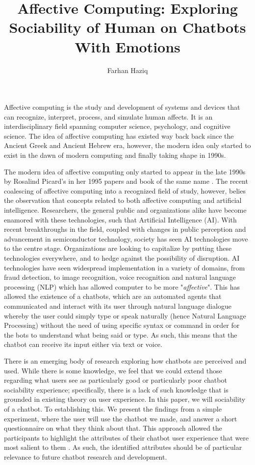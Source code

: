 \documentclass{vgtc}                          %
\title{Affective Computing: Exploring Sociability of Human on Chatbots With Emotions}
\author{Farhan Haziq}
\affiliation{\scriptsize Department of Computer Science \\ \textit{Colorado State University, Fort Collins, Colorado}}
\begin{document}
\maketitle
Affective computing is the study and development of systems and devices that can recognize, interpret, process, and simulate human affects. It is an interdisciplinary field spanning computer science, psychology, and cognitive science. \cite{10.5555/2099745} The idea of affective computing has existed way back back since the Ancient Greek and Ancient Hebrew \cite{picard_2000} era, however, the modern idea only started to exist in the dawn of modern computing and finally taking shape in 1990s.

The modern idea of affective computing only started to appear in the late 1990s by Rosalind Picard's in her 1995 papers and book of the same name \cite{picard_2000}. The recent coalescing of affective computing into a recognized field of study, however, belies the observation that concepts related to both affective computing and artificial intelligence. Researchers, the general public and organizations alike have become enamored with these technologies, such that Artificial Intelligence (AI). With recent breakthroughs in the field, coupled with changes in public perception and advancement in semiconductor technology, society has seen AI technologies move to the centre stage. Organizations are looking to capitalize by putting these technologies everywhere, and to hedge against the possibility of disruption. AI technologies have seen widespread implementation in a variety of domains, from fraud detection, to image recognition, voice recognition and natural language processing (NLP) which has allowed computer to be more  "\textit{affective}". This has allowed the existence of a chatbots, which are an automated agents that communicated and interact with its user through natural language dialogue whereby the user could simply type or speak naturally (hence Natural Language Processing) without the need of using specific syntax or command in order for the bots to understand what being said or type. As such, this means that the chatbot can receive its input either via text or voice.

There is an emerging body of research exploring how  chatbots are perceived and used. While there is some knowledge, we feel that we could extend those regarding what users see as particularly good or particularly poor chatbot sociability experience; specifically, 
there is a lack of such knowledge that is grounded in existing theory on user experience. In this paper, we will sociability of a chatbot. To establishing this. We present the findings from a simple experiment, where the user will use the chatbot we made, and answer a short questionnaire on what they think about that. This approach allowed the participants to highlight the attributes of their chatbot user experience that were most salient to them \cite{info13010041}. As such, the identified attributes should be of particular relevance to future chatbot research and development.
\end{document}
